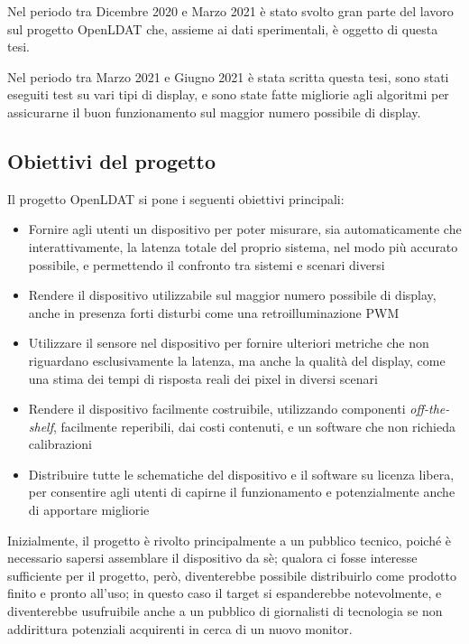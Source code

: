 Nel periodo tra Dicembre 2020 e Marzo 2021 è stato svolto gran parte del lavoro sul progetto OpenLDAT che, assieme ai dati sperimentali, è oggetto di questa tesi.

Nel periodo tra Marzo 2021 e Giugno 2021 è stata scritta questa tesi, sono stati eseguiti test su vari tipi di display, e sono state fatte migliorie agli algoritmi per assicurarne il buon funzionamento sul maggior numero possibile di display.

\subsection{Obiettivi del progetto}
Il progetto OpenLDAT si pone i seguenti obiettivi principali:
\begin{itemize}
	\item Fornire agli utenti un dispositivo per poter misurare, sia automaticamente che interattivamente, la latenza totale del proprio sistema, nel modo più accurato possibile, e permettendo il confronto tra sistemi e scenari diversi
	\item Rendere il dispositivo utilizzabile sul maggior numero possibile di display, anche in presenza forti disturbi come una retroilluminazione PWM
	\item Utilizzare il sensore nel dispositivo per fornire ulteriori metriche che non riguardano esclusivamente la latenza, ma anche la qualità del display, come una stima dei tempi di risposta reali dei pixel in diversi scenari
	\item Rendere il dispositivo facilmente costruibile, utilizzando componenti \textit{off-the-shelf}, facilmente reperibili, dai costi contenuti, e un software che non richieda calibrazioni
	\item Distribuire tutte le schematiche del dispositivo e il software su licenza libera, per consentire agli utenti di capirne il funzionamento e potenzialmente anche di apportare migliorie
\end{itemize}

Inizialmente, il progetto è rivolto principalmente a un pubblico tecnico, poiché è necessario sapersi assemblare il dispositivo da sè; qualora ci fosse interesse sufficiente per il progetto, però, diventerebbe possibile distribuirlo come prodotto finito e pronto all'uso; in questo caso il target si espanderebbe notevolmente, e diventerebbe usufruibile anche a un pubblico di giornalisti di tecnologia se non addirittura potenziali acquirenti in cerca di un nuovo monitor.

